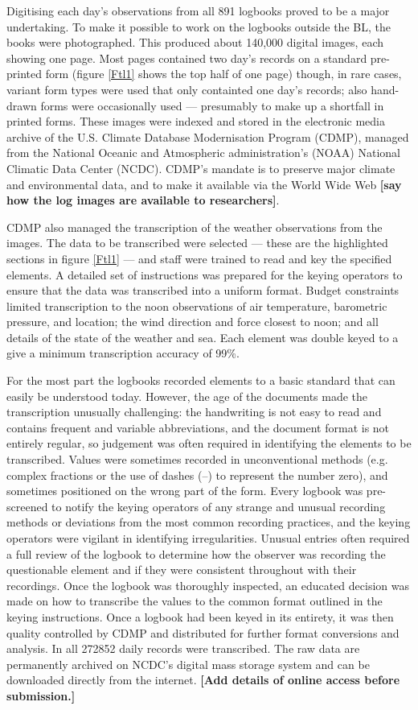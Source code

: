 \documentclass[CP]{copernicus}
\begin{document}
Digitising each day's observations from all 891 logbooks proved to be a major undertaking. To make it possible to work on the logbooks outside the BL, the books were photographed. This produced about 140,000 digital images, each showing one page. Most pages contained two day's records on a standard pre-printed form (figure \ref{Ftl1} shows the top half of one page) though, in rare cases, variant form types were used that only containted one day's records; also hand-drawn forms were occasionally used --- presumably to make up a shortfall in printed forms. These images were indexed and stored in the electronic media archive of the U.S. Climate Database Modernisation Program (CDMP), managed from the National Oceanic and Atmospheric administration's (NOAA) National Climatic Data Center (NCDC). CDMP's mandate is to preserve major climate and environmental data, and to make it available via the World Wide Web {\bf[say how the log images are available to researchers]}.

CDMP also managed the transcription of the weather observations from the images. The data to be transcribed were selected --- these are the highlighted sections in figure \ref{Ftl1} --- and staff were trained to read and key the specified elements. A detailed set of instructions was prepared for the keying operators to ensure that the data was transcribed into a uniform format. Budget constraints limited transcription to the noon observations of air temperature, barometric pressure, and location; the wind direction and force closest to noon; and all details of the state of the weather and sea. Each element was double keyed to a give a minimum transcription accuracy of 99\%.

For the most part the logbooks recorded elements to a basic standard that can easily be understood today. However, the age of the documents made the transcription unusually challenging: the handwriting is not easy to read and contains frequent and variable abbreviations, and the document format is not entirely regular, so judgement was often required in identifying the elements to be transcribed. Values were sometimes recorded in unconventional methods (e.g. complex fractions or the use of dashes (--) to represent the number zero), and sometimes positioned on the wrong part of the form. Every logbook was pre-screened to notify the keying operators of any strange and unusual recording methods or deviations from the most common recording practices, and the keying operators were vigilant in identifying irregularities. Unusual entries often required a full review of the logbook to determine how the observer was recording the questionable element and if they were consistent throughout with their recordings. Once the logbook was thoroughly inspected, an educated decision was made on how to transcribe the values to the common format outlined in the keying instructions. Once a logbook had been keyed in its entirety, it was then quality controlled by CDMP and distributed for further format conversions and analysis. In all 272852 daily records were transcribed. The raw data are permanently archived on NCDC's digital mass storage system and can be downloaded directly from the internet. {\bf[Add details of online access before submission.]}
\end{document}
